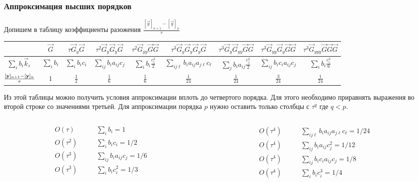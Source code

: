 \documentclass[professionalfonts,compress,unicode,aspectratio=169]{beamer}
\begin{document}
\begin{frame}\frametitle{Аппроксимация высших порядков}
	Допишем в таблицу коэффициенты разожения $\frac{[\vec y]_{n+1}-[\vec
y]_n}{\tau}$
	\begin{center}
	\footnotesize
	\begin{tabular}{p{3em}|c|c|c|c|c|c|c|c}
	&$\vec G$ &
	$\tau\vec G_y \vec G$ &
	$\tau^2\vec G_y \vec G_y \vec G$ & $\tau^2 \vec G_{yy} \vec G \vec G$ &
	$\tau^3 \vec G_y \vec G_y \vec G_y \vec G$ &
	$\tau^3 \vec G_y \vec G_{yy} \vec G \vec G$ &
	$\tau^3 \vec G_{yy} \vec G_y \vec G \vec G$ &
	$\tau^3 \vec G_{yyy} \vec G \vec G \vec G$\\\hline
	$\sum_i b_i \vec k_i$ &
	$\sum_i b_i$ &
	$\sum_i b_i c_i$ &
	$\sum_{ij} b_i a_{ij} c_j$ &
	$\sum_i b_i \frac{c_i^2}{2}$ &
	$\sum_{ij\ell} b_i a_{ij} a_{j\ell} c_\ell$ &
	$\sum_{j} b_i a_{ij} \frac{c_j^2}{2}$ &
	$\sum_{ij} b_i c_i a_{ij} c_j$ &
	$\sum_i b_i \frac{c_i^3}{6}$\\
	$\hspace{-.5em}\frac{[\vec y]_{n+1}-[\vec y]_n}{\tau}$&
	$1$&
	$\frac{1}{2}$&
	$\frac{1}{6}$&
	$\frac{1}{6}$&
	$\frac{1}{24}$&
	$\frac{1}{24}$&
	$\frac{3}{24}$&
	$\frac{1}{24}$
	\end{tabular}
	\end{center}
	Из этой таблицы можно получить условия аппроксимации вплоть до четвертого
порядка. Для этого необходимо приравнять выражения во второй строке со
значениями третьей. Для аппроксимации порядка $p$ нужно оставить только столбцы
с $\tau^q$ где $q < p$.
	\begin{columns}
	\begin{column}{.5\textwidth}
	\begin{align*}
	O(\tau  ) \qquad &\textstyle \sum_i b_i = 1\\
	O(\tau^2) \qquad &\textstyle \sum_i b_i c_i = 1/2\\
	O(\tau^3) \qquad &\textstyle \sum_{ij} b_i a_{ij} c_j = 1/6\\
	O(\tau^3) \qquad &\textstyle \sum_i b_i c_i^2 = 1/3
	\end{align*}
	\end{column}
	\begin{column}{.5\textwidth}
	\begin{align*}
	O(\tau^4) \qquad &\textstyle \sum_{ij\ell} b_i a_{ij} a_{j\ell} c_\ell = 1/24\\
	O(\tau^4) \qquad &\textstyle \sum_{ij} b_i a_{ij} c_j^2 = 1/12\\
	O(\tau^4) \qquad &\textstyle \sum_{ij} b_i c_i a_{ij} c_j = 1/8\\
	O(\tau^4) \qquad &\textstyle \sum_{i} b_i c_i^3 = 1/4
	\end{align*}
	\end{column}
	\end{columns}
\end{frame}
\end{document}
